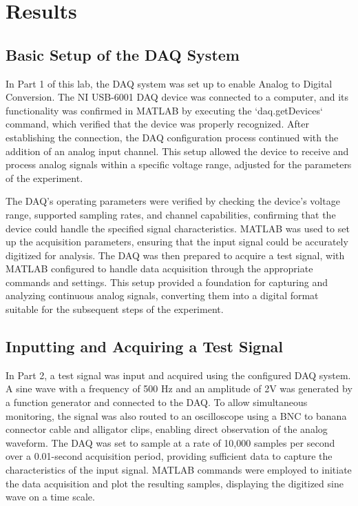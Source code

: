 \documentclass[12pt]{article}
\begin{document}
\section{Results}
\subsection{Basic Setup of the DAQ System}
In Part 1 of this lab, the DAQ system was set up to enable Analog to 
Digital Conversion. The NI USB-6001 DAQ device was connected to a 
computer, and its functionality was confirmed in MATLAB by executing 
the `daq.getDevices` command, which verified that the device was 
properly recognized. After establishing the connection, the DAQ 
configuration process continued with the addition of an analog input 
channel. This setup allowed the device to receive and process analog 
signals within a specific voltage range, adjusted for the parameters 
of the experiment.
\newline

The DAQ’s operating parameters were verified by checking the device’s 
voltage range, supported sampling rates, and channel capabilities, 
confirming that the device could handle the specified signal 
characteristics. MATLAB was used to set up the acquisition parameters, 
ensuring that the input signal could be accurately digitized for 
analysis. The DAQ was then prepared to acquire a test signal, with 
MATLAB configured to handle data acquisition through the appropriate 
commands and settings. This setup provided a foundation for capturing 
and analyzing continuous analog signals, converting them into a digital 
format suitable for the subsequent steps of the experiment.
\newline

\subsection{Inputting and Acquiring a Test Signal}
In Part 2, a test signal was input and acquired using the configured 
DAQ system. A sine wave with a frequency of 500 Hz and an amplitude of 
2V was generated by a function generator and connected to the DAQ. To 
allow simultaneous monitoring, the signal was also routed to an 
oscilloscope using a BNC to banana connector cable and alligator clips, 
enabling direct observation of the analog waveform. The DAQ was set to 
sample at a rate of 10,000 samples per second over a 0.01-second 
acquisition period, providing sufficient data to capture the 
characteristics of the input signal. 
MATLAB commands were employed to initiate the data acquisition and plot 
the resulting samples, displaying the digitized sine wave on a time scale.
\newline
\end{document}
